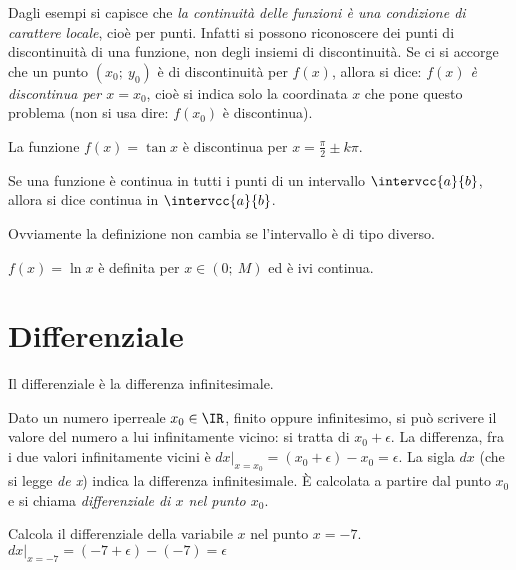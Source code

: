 Dagli esempi si capisce che \emph{la continuità delle funzioni è una condizione 
di carattere locale}, cioè per punti. Infatti si possono riconoscere dei punti
di discontinuità di una funzione, non degli insiemi di discontinuità.
Se ci si accorge che un punto $(x_0;\ y_0)$ è di discontinuità
per $f(x)$, allora si dice: \emph{$f(x)$ è discontinua per $x=x_0$},
cioè si indica solo la coordinata $x$ che pone questo problema 
(non si usa dire: $f(x_0)$ è discontinua).
\begin{esempio}
 La funzione $f(x)= \tan x$ è discontinua per $x=\frac{\pi}{2}\pm k\pi$.
\end{esempio}

\begin{definizione}
Se una funzione è continua in tutti i punti di un intervallo $\intervcc{a}{b}$,
allora si dice continua in $\intervcc{a}{b}$.
\end{definizione}
\begin{osservazione}
 Ovviamente la definizione non cambia se l'intervallo è di tipo diverso.
\end{osservazione}

\begin{esempio}
 $f(x)=\ln x$ è definita per $x \in (0;\ M)$ ed è ivi continua.
\end{esempio}


\section{Differenziale}
\label{sec:04_differenziale}

\begin{definizione}
 Il differenziale è la differenza infinitesimale.
\end{definizione}

Dato un numero iperreale $x_0\in\IR$, finito oppure infinitesimo, si può scrivere il 
valore del numero a lui infinitamente vicino: si tratta di $x_0+\epsilon$. La differenza, 
fra i due valori infinitamente vicini è $dx|_{x=x_0}=(x_0+\epsilon)-x_0=\epsilon$.
La sigla $dx$ (che si legge \emph{de x}) indica la differenza infinitesimale.
È calcolata a partire dal punto $x_0$ e si chiama \emph{differenziale di $x$ nel punto $x_0$}.

\begin{esempio}
 Calcola il differenziale della variabile $x$ nel punto $x=-7$.\\
 $dx|_{x=-7}=(-7+\epsilon)-(-7)=\epsilon$
\end{esempio}

